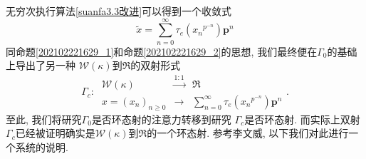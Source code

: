\documentclass[UTF8, twoside]{ctexart}
\theoremstyle{nonumberplain}
\theoremstyle{nonumberplain}
\theoremstyle{plain}
\begin{document}
	无穷次执行算法\ref{suanfa3.3改进}可以得到一个收敛式
	\begin{equation} \label{202103061212_5}
		\widetilde{x}=\sum\limits_{n=0}^{\infty }{{{\tau }_{e}}\left( {{x}_{n}}^{{{p}^{-n}}} \right){\bm{p}^{n}}}
	\end{equation}
	同命题\ref{202102221629_1}和命题\ref{202102221629_2}的思想, 我们最终便在$\Gamma_0$的基础上导出了另一种
	$\mathcal{W}\left( \kappa  \right)$到$\Re $的双射形式
	\begin{equation} \label{环态射目标终式}
		{{\Gamma }_{c}}:\ \begin{matrix}
			\mathcal{W}\left( \kappa  \right) & 
			\xrightarrow{1:1}  
			& \Re   \\
			x={{\left( {{x}_{n}} \right)}_{n\ge 0}} & \to  & \sum\limits_{n=0}^{\infty }{{{\tau }_{e}}\left( {{x}_{n}}^{{{p}^{-n}}} \right){\bm{p}^{n}}}
		\end{matrix}.
	\end{equation}
	至此, 我们将研究$\Gamma_0$是否环态射的注意力转移到研究
	$\Gamma_c$是否环态射. 而实际上双射$\Gamma_c$已经被证明确实是$\mathcal{W}\left( \kappa  \right)$到$\Re $的一个环态射. 参考李文威\cite[\S~10.9]{liwenwei}, 以下我们对此进行一个系统的说明.
	\vskip 0.5cm
	
\end{document}

